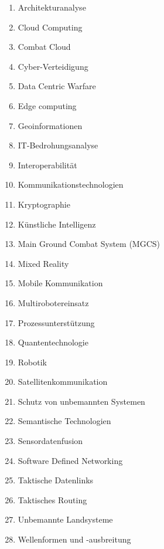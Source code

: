 \begin{enumerate}
	
	\item Architekturanalyse 
	 \item Cloud Computing
	 \item Combat Cloud
	 \item Cyber-Verteidigung
	 \item Data Centric Warfare
	 \item Edge computing
	 \item Geoinformationen
	 \item IT-Bedrohungsanalyse
	 \item Interoperabilität
	 \item Kommunikationstechnologien
	 \item Kryptographie
	 \item Künstliche Intelligenz
	 \item Main Ground Combat System (MGCS)
	 \item Mixed Reality
	 \item Mobile Kommunikation
	 \item Multirobotereinsatz
	 \item Prozessunterstützung
	 \item Quantentechnologie
	 \item Robotik
	 \item Satellitenkommunikation
	 \item Schutz von unbemannten Systemen
	 \item Semantische Technologien
	 \item Sensordatenfusion
	 \item Software Defined Networking
	 \item Taktische Datenlinks
	 \item Taktisches Routing
	 \item Unbemannte Landsysteme
	 \item Wellenformen und -ausbreitung
	
\end{enumerate}
